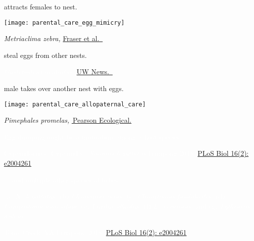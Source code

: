\label{key}\documentclass[t]{beamer}
\begin{document}
\begin{frame}[t]{ attracts females to nest.}

\texttt{[image: parental\_care\_egg\_mimicry]}

\vfilll

\tinyfill \textit{Metriaclima zebra,} \href{https://commons.wikimedia.org/wiki/File:Metriaclima_zebra.jpg}{Fraser et al.~}

\end{frame}

{
\begin{frame}[t]{ steal eggs from other nests.}

\vfilll

\tinyfill \textcolor{white}{\textit{Gasterosteus aculeatus,} \href{https://www.flickr.com/photos/uwnews/32266221751}{UW News.~}} 

\end{frame}
}

%

\begin{frame}[t]{ male takes over another nest with eggs.}

\texttt{[image: parental\_care\_allopaternal\_care]}

\vfilll

\tinyfill \textit{Pimephales promelas,} \href{https://pearsonecological.com/fish-l2-single/fathead-minnow/}{\textcopyright\,Pearson Ecological.}
\end{frame}

%

{
\begin{frame}[t]{\textcolor{white}{\textcolor{orange4}{Egg dumping} might be a mutualism among a host species$\dots$}}

\vfilll

\tiny \textcolor{white}{Cypriniformes: Cyprinidae: \textit{Nocomis biguttatus} \hfill Frimpong 2018. \href{https://doi.org/10.1371/journal.pbio.2004261}{PLoS Biol 16(2): e2004261}. }
\end{frame}
}



{
\begin{frame}[t]{\textcolor{white}{$\dots$ and multiple other species of fishes.}}


\vspace*{6.5cm}

\textcolor{white}{\small (a) \textit{N.~biguttatus,} (b) \textit{Chrosomus oreas,} (c) \textit{Clinostomus funduloides,} (d) \textit{Campostoma anomalum,} (e) \textit{Luxilus albeolus,} (f) \textit{L.~cerasinus,} and (g) \textit{Lythrurus ardens.}}

\vfilll

\tiny \textcolor{white}{Toms Creek, VA \hfill Frimpong 2018. \href{https://doi.org/10.1371/journal.pbio.2004261}{PLoS Biol 16(2): e2004261}. }
\end{frame}
}
\end{document}
